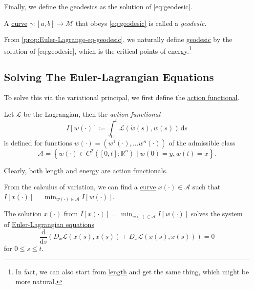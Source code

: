 Finally, we define the \hyperref[def:geodesic]{geodesics} as the solution of \autoref{eq:geodesic}.

\begin{definition}[Geodesic]\label{def:geodesic}
	A \hyperref[def:curve]{curve} \(\gamma \colon [a, b] \to \mathcal{M} \) that obeys \autoref{eq:geodesic} is called a \emph{geodesic}.
\end{definition}

\begin{intuition}
	From \autoref{prop:Euler-Lagrange-eq-geodesic}, we naturally define \hyperref[def:geodesic]{geodesic} by the solution of \autoref{eq:geodesic}, which is the critical points of \hyperref[def:energy]{energy}.\footnote{In fact, we can also start from \hyperref[def:length]{length} and get the same thing, which might be more natural.}
\end{intuition}

\subsection{Solving The Euler-Lagrangian Equations}
To solve this via the variational principal, we first define the \hyperref[def:action-functional]{action functional}.

\begin{definition}\label{def:action-functional}
	Let \(\mathcal{L} \) be the Lagrangian, then the \emph{action functional}
	\[
		I[w(\cdot)] \coloneqq \int_{0}^{t} \mathcal{L} (\dot{w}(s), w(s)) \,\mathrm{d}s
	\]
	is defined for functions \(w(\cdot) = (w^1(\cdot), \ldots w^n(\cdot))\) of the admissible class
	\[
		\mathcal{A} =\left\{ w(\cdot)\in C^2([0, t]; \mathbb{R} ^n) \mid w(0)= y, w(t)= x\right\}.
	\]
\end{definition}

\begin{eg}
	Clearly, both \hyperref[def:length]{length} and \hyperref[def:energy]{energy} are \hyperref[def:action-functional]{action functionals}.
\end{eg}

From the calculus of variation, we can find a \hyperref[def:curve]{curve} \(x(\cdot)\in \mathcal{A} \) such that \(I[x(\cdot)] = \min _{w(\cdot)\in \mathcal{A} }I[w(\cdot)]\).

\begin{theorem}\label{thm:Euler-Lagrangian-eq}
	The solution \(x(\cdot)\) from \(I[x(\cdot)] = \min _{w(\cdot)\in \mathcal{A} }I[w(\cdot)]\) solves the system of \href{https://en.wikipedia.org/wiki/Euler-Lagrange_equation}{Euler-Lagrangian equations}
	\[
		\frac{\mathrm{d}}{\mathrm{d}s} \left( D_{\dot{x}} \mathcal{L} (\dot{x}(s), x(s)) + D_x \mathcal{L} (\dot{x}(s), x(s)) \right) = 0
	\]
	for \(0 \leq s \leq t\).
\end{theorem}
